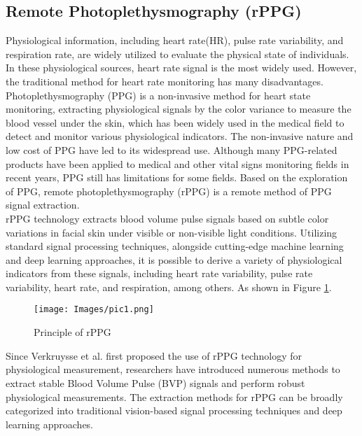 \documentclass[a4paper]{article}
\begin{document}
\subsection{Remote Photoplethysmography (rPPG)}
Physiological information, including heart rate(HR), pulse rate variability, and respiration rate, are widely utilized to evaluate the physical state of individuals. In these physiological sources, heart rate signal is the most widely used. However, the traditional method for heart rate monitoring has many disadvantages. Photoplethysmography (PPG) is a non-invasive method for heart state monitoring, extracting physiological signals by the color variance to measure the blood vessel under the skin, which has been widely used in the medical field to detect and monitor various physiological indicators\cite{schrumpf2021assessment}. 
The non-invasive nature and low cost of PPG have led to its widespread use. Although many PPG-related products have been applied to medical and other vital signs monitoring fields in recent years, PPG still has limitations for some fields. Based on the exploration of PPG, remote photoplethysmography (rPPG) is a remote method of PPG signal extraction. 
\\
rPPG technology extracts blood volume pulse signals based on subtle color variations in facial skin under visible or non-visible light conditions. Utilizing standard signal processing techniques, alongside cutting-edge machine learning and deep learning approaches, it is possible to derive a variety of physiological indicators from these signals, including heart rate variability, pulse rate variability, heart rate, and respiration, among others\cite{lewandowska2012measuring}. As shown in Figure \ref{Principle of rPPG}. 
\begin{figure}[htbp]
    \centering
    \texttt{[image: Images/pic1.png]}
    \caption{Principle of rPPG}
    \label{Principle of rPPG}
\end{figure}
Since Verkruysse et al. first proposed the use of rPPG technology for physiological measurement, researchers have introduced numerous methods to extract stable Blood Volume Pulse (BVP) signals and perform robust physiological measurements\cite{verkruysse2008remote}. The extraction methods for rPPG can be broadly categorized into traditional vision-based signal processing techniques and deep learning approaches.
\end{document}

